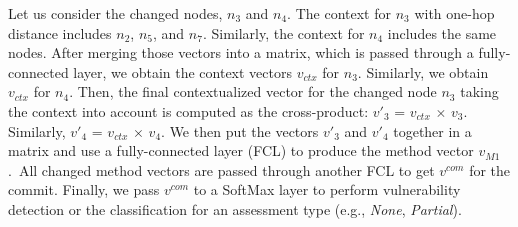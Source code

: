 Let us consider the changed nodes, $n_3$ and $n_4$. The context for
$n_3$ with one-hop distance includes $n_2$, $n_5$, and
$n_7$. Similarly, the context for $n_4$ includes the same nodes. After
merging those vectors into a matrix, which is passed through a
fully-connected layer, we obtain the context vectors $v_{ctx}$ for
$n_3$. Similarly, we obtain $v_{ctx}$ for $n_4$. Then, the final
contextualized vector for the changed node $n_3$ taking the context
into account is computed as the cross-product: $v'_3$ = $v_{ctx}$
$\times$ $v_3$. Similarly, $v'_4$ = $v_{ctx}$ $\times$ $v_4$.
%
We then put the vectors $v'_3$ and $v'_4$ together in a matrix and use
a fully-connected layer (FCL) to produce the method vector
$v_{M1}$.~All changed method vectors are passed through another FCL to
get $v^{com}$ for the commit. Finally, we pass $v^{com}$ to a SoftMax
layer to perform vulnerability detection or the classification for an
assessment type (e.g., {\em None}, {\em Partial}).




